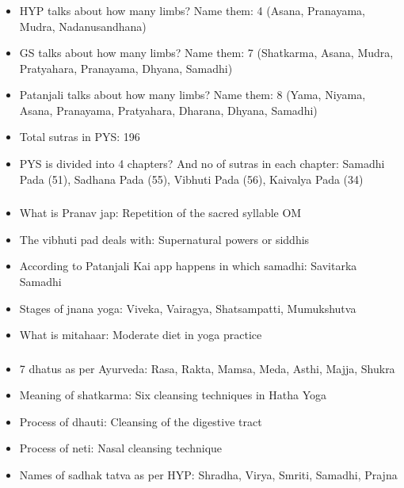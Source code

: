 \begin{frame}[fragile]\frametitle{}
\begin{itemize}
\item HYP talks about how many limbs? Name them: 4 (Asana, Pranayama, Mudra, Nadanusandhana)
\item GS talks about how many limbs? Name them: 7 (Shatkarma, Asana, Mudra, Pratyahara, Pranayama, Dhyana, Samadhi)
\item Patanjali talks about how many limbs? Name them: 8 (Yama, Niyama, Asana, Pranayama, Pratyahara, Dharana, Dhyana, Samadhi)
\item Total sutras in PYS: 196
\item PYS is divided into 4 chapters? And no of sutras in each chapter: Samadhi Pada (51), Sadhana Pada (55), Vibhuti Pada (56), Kaivalya Pada (34)
\end{itemize}
\end{frame}

\begin{frame}[fragile]\frametitle{}
\begin{itemize}
\item What is Pranav jap: Repetition of the sacred syllable OM
\item The vibhuti pad deals with: Supernatural powers or siddhis
\item According to Patanjali Kai app happens in which samadhi: Savitarka Samadhi
\item Stages of jnana yoga: Viveka, Vairagya, Shatsampatti, Mumukshutva
\item What is mitahaar: Moderate diet in yoga practice
\end{itemize}
\end{frame}

\begin{frame}[fragile]\frametitle{}
\begin{itemize}
\item 7 dhatus as per Ayurveda: Rasa, Rakta, Mamsa, Meda, Asthi, Majja, Shukra
\item Meaning of shatkarma: Six cleansing techniques in Hatha Yoga
\item Process of dhauti: Cleansing of the digestive tract
\item Process of neti: Nasal cleansing technique
\item Names of sadhak tatva as per HYP: Shradha, Virya, Smriti, Samadhi, Prajna
\end{itemize}
\end{frame}

